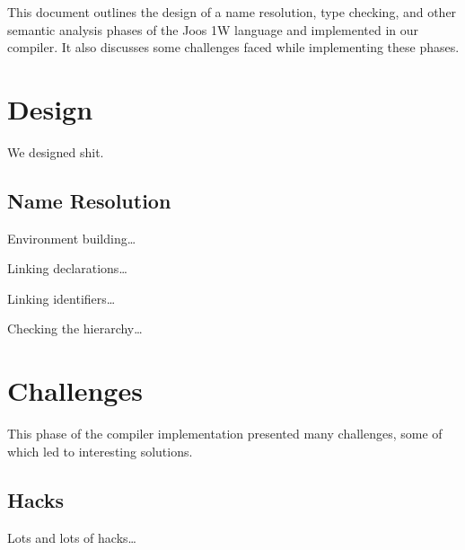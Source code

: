 \documentclass[pdftex,11pt,a4paper]{article}
\begin{document}

This document outlines the design of a name resolution, type checking,
and other semantic analysis phases of the Joos 1W language and
implemented in our compiler. It also discusses some challenges faced
while implementing these phases.


\section{Design}

We designed shit.

\subsection{Name Resolution}

Environment building\ldots

Linking declarations\ldots

Linking identifiers\ldots

Checking the hierarchy\ldots


\section{Challenges}

This phase of the compiler implementation presented many
challenges, some of which led to interesting solutions.

\subsection{Hacks}

Lots and lots of hacks\ldots
\end{document}
